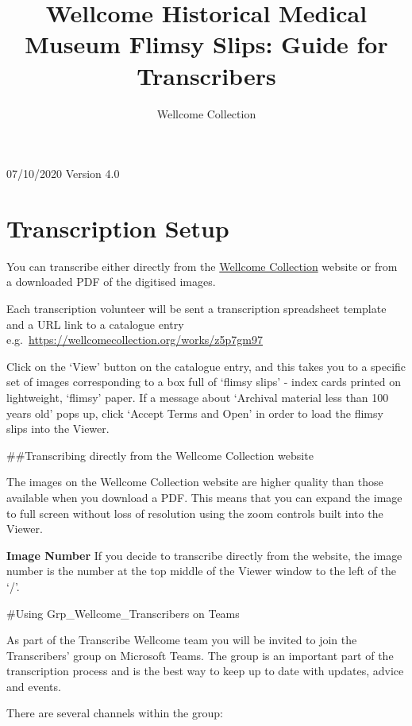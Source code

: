\documentclass[
  openany]{book}
\title{Wellcome Historical Medical Museum Flimsy Slips: Guide for Transcribers}
\author{Wellcome Collection}
\date{}
\begin{document}
\maketitle

{
\setcounter{tocdepth}{1}
\tableofcontents
}
07/10/2020
Version 4.0

\hypertarget{transcription-setup}{%
\chapter{Transcription Setup}\label{transcription-setup}}

You can transcribe either directly from the \href{https://wellcomecollection.org}{Wellcome Collection} website or from a downloaded PDF of the digitised images.

Each transcription volunteer will be sent a transcription spreadsheet template and a URL link to a catalogue entry
e.g.~\url{https://wellcomecollection.org/works/z5p7gm97}

Click on the `View' button on the catalogue entry, and this takes you to a specific set of images corresponding to a box full of `flimsy slips' - index cards printed on lightweight, `flimsy' paper. If a message about `Archival material less than 100 years old' pops up, click `Accept Terms and Open' in order to load the flimsy slips into the Viewer.

\#\#Transcribing directly from the Wellcome Collection website

The images on the Wellcome Collection website are higher quality than those available when you download a PDF. This means that you can expand the image to full screen without loss of resolution using the zoom controls built into the Viewer.

\textbf{Image Number} If you decide to transcribe directly from the website, the image number is the number at the top middle of the Viewer window to the left of the `/'.

\#Using Grp\_Wellcome\_Transcribers on Teams

As part of the Transcribe Wellcome team you will be invited to join the Transcribers' group on Microsoft Teams. The group is an important part of the transcription process and is the best way to keep up to date with updates, advice and events.

There are several channels within the group:
\end{document}

